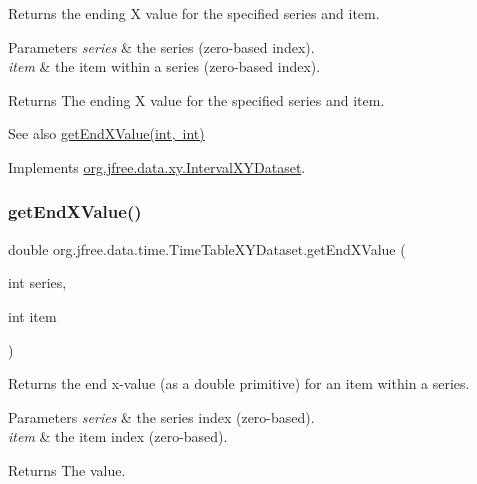 Returns the ending X value for the specified series and item.


\begin{DoxyParams}{Parameters}
{\em series} & the series (zero-\/based index). \\
\hline
{\em item} & the item within a series (zero-\/based index).\\
\hline
\end{DoxyParams}
\begin{DoxyReturn}{Returns}
The ending X value for the specified series and item.
\end{DoxyReturn}
\begin{DoxySeeAlso}{See also}
\mbox{\hyperlink{classorg_1_1jfree_1_1data_1_1time_1_1_time_table_x_y_dataset_a436f721f4b20c9209b8fdc9b3e947e62}{get\+End\+X\+Value(int, int)}} 
\end{DoxySeeAlso}


Implements \mbox{\hyperlink{interfaceorg_1_1jfree_1_1data_1_1xy_1_1_interval_x_y_dataset_a93161a6d6c1db37cfac030239c62ab0a}{org.\+jfree.\+data.\+xy.\+Interval\+X\+Y\+Dataset}}.

\mbox{\label{classorg_1_1jfree_1_1data_1_1time_1_1_time_table_x_y_dataset_a436f721f4b20c9209b8fdc9b3e947e62}} 
\subsubsection{\texorpdfstring{get\+End\+X\+Value()}{getEndXValue()}}
{\footnotesize\ttfamily double org.\+jfree.\+data.\+time.\+Time\+Table\+X\+Y\+Dataset.\+get\+End\+X\+Value (\begin{DoxyParamCaption}\item[{int}]{series,  }\item[{int}]{item }\end{DoxyParamCaption})}

Returns the end x-\/value (as a double primitive) for an item within a series.


\begin{DoxyParams}{Parameters}
{\em series} & the series index (zero-\/based). \\
\hline
{\em item} & the item index (zero-\/based).\\
\hline
\end{DoxyParams}
\begin{DoxyReturn}{Returns}
The value. 
\end{DoxyReturn}


